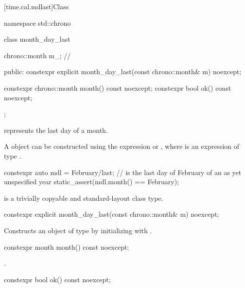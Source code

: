 [time.cal.mdlast]{Class }

\begin{codeblock}
namespace std::chrono {
  class month_day_last {
    chrono::month m_;                   // \expos

  public:
    constexpr explicit month_day_last(const chrono::month& m) noexcept;

    constexpr chrono::month month() const noexcept;
    constexpr bool ok() const noexcept;
  };
}
\end{codeblock}

\pnum
{} represents the last day of a month.

\pnum
\begin{note}
A  object
can be constructed using the expression  or ,
where  is an expression of type .
\end{note}
\begin{example}
\begin{codeblock}
constexpr auto mdl = February/last;     //  is the last day of February of an as yet unspecified year
static_assert(mdl.month() == February);
\end{codeblock}
\end{example}

\pnum
{} is a trivially copyable and standard-layout class type.

%
\begin{itemdecl}
constexpr explicit month_day_last(const chrono::month& m) noexcept;
\end{itemdecl}

\begin{itemdescr}
\pnum
\effects
Constructs an object of type  by
initializing  with .
\end{itemdescr}

%
\begin{itemdecl}
constexpr month month() const noexcept;
\end{itemdecl}

\begin{itemdescr}
\pnum
\returns
{}.
\end{itemdescr}

%
\begin{itemdecl}
constexpr bool ok() const noexcept;
\end{itemdecl}

